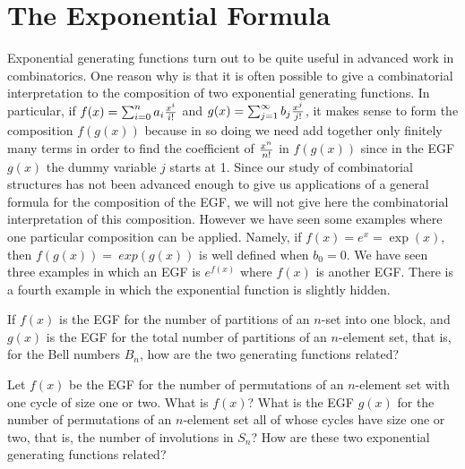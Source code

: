 \section{The Exponential Formula}
Exponential generating functions turn out to be quite useful in advanced
work in combinatorics.  One reason why is that it is often possible to
give a combinatorial interpretation to the composition of two exponential
generating functions. In particular, if
$f(x) =
\sum_{i=0}^n a_i{x^i\over i!}$ and
$g(x) = \sum_{j=1}^\infty b_j {x^j\over j!}$, it makes sense to form the
composition $f(g(x))$ because in so doing we need add together only
finitely many terms in order to find the coefficient of $x^n\over n!$ in
$f(g(x))$ since in the EGF  $g(x)$ the dummy variable $j$ starts at 1.
Since our study of combinatorial structures has not been advanced enough
to give us applications of a general formula for the composition of the
EGF, we will not give here the combinatorial interpretation of this
composition.  However we have seen some examples where one particular
composition can be applied.  Namely, if $f(x) = e^x = \exp(x)$, then
$f(g(x)) =\ exp(g(x))$ is well defined when $b_0=0$.  We have seen three
examples in which an EGF is $e^{f(x)}$
where $f(x)$ is another EGF.  There is a fourth example in which the
exponential function is slightly hidden.

\bp
\itemes If $f(x)$ is the EGF for the number of partitions of an $n$-set
into one block, and $g(x)$ is the EGF for the total number of partitions
of an
$n$-element set, that is, for the Bell numbers $B_n$, how are the two
generating functions related?  \label{exp(oneblock)}

\itemes Let  $f(x)$ be the EGF for the number of
permutations of an $n$-element set with one cycle of size one or two. 
What is
$f(x)$?  What is the EGF $g(x)$ for the number of permutations of an
$n$-element set all of whose cycles have size one or two, that is, the
number of involutions in $S_n$?  How are these two exponential generating
functions related?\label{exp(oneortwo-cycle)}

